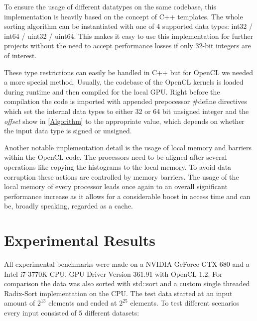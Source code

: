 \documentclass{llncs}
\begin{document}
To ensure the usage of different datatypes on the same codebase, this implementation is heavily based on the concept of C++ templates. The whole sorting algorithm can be instantiated with one of 4 supported data types: int32 / int64 / uint32 / uint64. This makes it easy to use this implementation for further projects without the need to accept performance losses if only 32-bit integers are of interest.

These type restrictions can easily be handled in C++ but for OpenCL we needed a more special method. Usually, the codebase of the OpenCL kernels is loaded during runtime and then compiled for the local GPU. Right before the compilation the code is imported with appended prepocessor \#define directives which set the internal data types to either 32 or 64 bit unsigned integer and the \textit{offset} show in \ref{Algorithm} to the appropriate value, which depends on whether the input data type is signed or unsigned.

Another notable implementation detail is the usage of local memory and barriers within the OpenCL code. The processors need to be aligned after several operations like copying the histograms to the local memory. To avoid data corruption these actions are controlled by memory barriers. The usage of the local memory of every processor leads once again to an overall significant performance increase as it allows for a considerable boost in access time and can be, broadly speaking, regarded as a cache.

\newpage
\section{Experimental Results}
All experimental benchmarks were made on a NVIDIA GeForce GTX 680 and a Intel i7-3770K CPU. GPU Driver Version 361.91 with OpenCL 1.2. For comparison the data was also sorted with std::sort and a custom single threaded Radix-Sort implementation on the CPU. The test data started at an input amount of $2^{13}$ elements and ended at $2^{25}$ elements. To test different scenarios every input consisted  of 5 different datasets:
\end{document}
